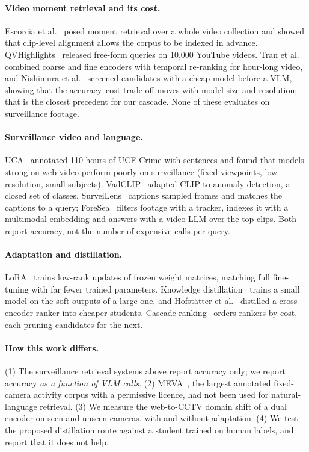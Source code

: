 \documentclass[11pt,a4paper]{article}
\begin{document}
\paragraph{Video moment retrieval and its cost.} Escorcia et al.~\cite{escorcia} posed moment retrieval over a whole
video collection and showed that clip-level alignment allows the corpus to be indexed in advance.
QVHighlights~\cite{qvhighlights} released free-form queries on 10,000 YouTube videos. Tran et
al.~\cite{tran} combined coarse and fine encoders with temporal re-ranking for hour-long video, and Nishimura et
al.~\cite{superimage} screened candidates with a cheap model before a VLM, showing that the accuracy--cost
trade-off moves with model size and resolution; that is the closest precedent for our cascade. None of these
evaluates on surveillance footage.

\paragraph{Surveillance video and language.} UCA~\cite{uca} annotated 110 hours of UCF-Crime with sentences and found
that models strong on web video perform poorly on surveillance (fixed viewpoints, low resolution, small subjects).
VadCLIP~\cite{vadclip} adapted CLIP to anomaly detection, a closed set of classes. SurveiLens~\cite{surveilens}
captions sampled frames and matches the captions to a query; ForeSea~\cite{foresea} filters footage with a tracker,
indexes it with a multimodal embedding and answers with a video LLM over the top clips. Both report accuracy, not
the number of expensive calls per query.

\paragraph{Adaptation and distillation.} LoRA~\cite{lora} trains low-rank updates of frozen weight matrices, matching
full fine-tuning with far fewer trained parameters. Knowledge distillation~\cite{hinton} trains a small model on the
soft outputs of a large one, and Hofst\"atter et al.~\cite{hofstatter} distilled a cross-encoder ranker into cheaper
students. Cascade ranking~\cite{cascade} orders rankers by cost, each pruning candidates for the next.

\paragraph{How this work differs.} (1) The surveillance retrieval systems above report accuracy only; we report
accuracy \emph{as a function of VLM calls}. (2) MEVA~\cite{meva}, the largest annotated fixed-camera activity
corpus with a permissive licence, had not been used for natural-language retrieval. (3) We measure the web-to-CCTV
domain shift of a dual encoder on seen and unseen cameras, with and without adaptation. (4) We test the proposed
distillation route against a student trained on human labels, and report that it does not help.
\end{document}

